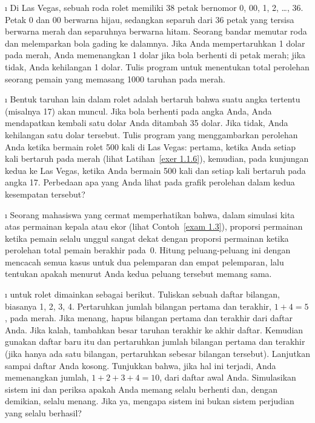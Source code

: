 \begin{LJSItem}
\i\label{exer 1.1.6} Di Las Vegas, sebuah roda rolet memiliki 38 petak
bernomor 0, 00, 1, 2, \dots, 36.  Petak 0 dan 00 berwarna hijau, sedangkan separuh dari
36 petak
yang tersisa berwarna merah dan separuhnya berwarna hitam.  Seorang bandar memutar roda
dan
melemparkan bola gading ke dalamnya.  Jika Anda mempertaruhkan 1 dolar pada merah, Anda memenangkan 1 dolar jika
bola berhenti di petak merah; jika tidak, Anda kehilangan 1 dolar.  Tulis program untuk
menentukan total perolehan seorang pemain yang memasang 1000 taruhan pada merah.

\i\label{exer 1.1.7} Bentuk taruhan lain dalam rolet adalah bertaruh bahwa suatu
angka tertentu (misalnya 17) akan muncul.  Jika bola berhenti pada angka Anda, Anda
mendapatkan kembali satu dolar Anda ditambah 35 dolar.  Jika tidak, Anda kehilangan satu dolar tersebut.  Tulis
program yang menggambarkan perolehan Anda ketika bermain rolet 500 kali di
Las
Vegas: pertama, ketika Anda setiap kali bertaruh pada merah (lihat Latihan~\ref{exer 1.1.6}), 
kemudian, pada kunjungan kedua ke Las Vegas, ketika Anda bermain 500 kali dan setiap
kali
bertaruh pada angka 17.  Perbedaan apa yang Anda lihat pada grafik perolehan
dalam
kedua kesempatan tersebut?

\i\label{exer 1.1.8} Seorang mahasiswa yang cermat memperhatikan bahwa, dalam simulasi kita atas
permainan kepala
atau ekor (lihat Contoh~\ref{exam 1.3}), proporsi permainan ketika
pemain selalu unggul sangat dekat dengan proporsi permainan ketika
perolehan total
pemain berakhir pada~0.  Hitung peluang-peluang ini dengan
mencacah
semua kasus untuk dua pelemparan dan empat pelemparan, lalu tentukan apakah menurut Anda
kedua peluang tersebut memang sama.

\i\label{exer 1.1.9}  
untuk rolet dimainkan
sebagai berikut.  Tuliskan sebuah daftar bilangan, biasanya 1, 2, 3, 4.  Pertaruhkan jumlah
bilangan
pertama dan terakhir, $1 + 4 = 5$, pada merah.  Jika menang, hapus bilangan pertama dan
terakhir
dari daftar Anda.  Jika kalah, tambahkan besar taruhan terakhir ke
akhir daftar.  Kemudian gunakan daftar baru itu dan pertaruhkan jumlah bilangan pertama dan
terakhir
(jika hanya ada satu bilangan, pertaruhkan sebesar bilangan tersebut).  Lanjutkan sampai
daftar Anda kosong.  Tunjukkan bahwa, jika hal ini terjadi, Anda memenangkan jumlah, $1 + 2 + 3
+ 4
= 10$, dari daftar awal Anda.  Simulasikan sistem ini dan periksa apakah Anda memang selalu
berhenti dan, dengan demikian, selalu menang.  Jika ya, mengapa sistem ini bukan sistem perjudian yang
selalu berhasil?


\end{LJSItem}
